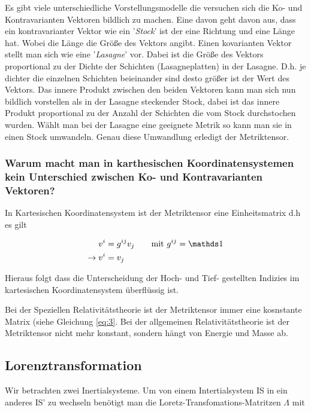 Es gibt viele unterschiedliche Vorstellungsmodelle die versuchen sich die Ko- und Kontravarianten Vektoren bildlich zu machen. Eine davon geht davon aus, dass ein kontravarianter Vektor wie ein '\textit{Stock}' ist der eine Richtung und eine Länge hat. Wobei die Länge die Größe des Vektors angibt. Einen kovarianten Vektor stellt man sich wie eine '\textit{Lasagne}' vor. Dabei ist die Größe des Vektors proportional zu der Dichte der Schichten (Lasagneplatten) in der Lasagne. D.h. je dichter die einzelnen Schichten beieinander sind desto größer ist der Wert des Vektors. Das innere Produkt zwischen den beiden Vektoren kann man sich nun bildlich vorstellen als in der Lasagne steckender Stock, dabei ist das innere Produkt proportional zu der Anzahl der Schichten die vom Stock durchstochen wurden. Wählt man bei der Lasagne eine geeignete Metrik so kann man sie in einen Stock umwandeln. Genau diese Umwandlung erledigt der Metriktensor. 

\subsubsection*{Warum macht man in karthesischen Koordinatensystemen kein Unterschied zwischen Ko- und Kontravarianten Vektoren? }

In Kartesischen Koordinatensystem ist der Metriktensor eine Einheitsmatrix d.h es gilt

\begin{align}
  \label{eq:20}
  v^i &= g^{ij}v_j \qquad\text{mit } g^{ij}=\mathds 1 \notag \\
\rightarrow v^i &= v_j 
\end{align}

Hieraus folgt dass die Unterscheidung der Hoch- und Tief- gestellten Indizies im kartesischen Koordinatensystem überflüssig ist. 

Bei der Speziellen Relativitätstheorie ist der Metriktensor immer eine kosnstante Matrix (siehe Gleichung \eqref{eq:3}. Bei der allgemeinen Relativitätstheorie ist der Metriktensor nicht mehr konstant, sondern hängt von Energie und Masse ab.


\subsection*{Lorenztransformation}

Wir betrachten zwei Inertialsysteme. Um von einem Intertialsystem IS in ein anderes IS' zu wechseln benötigt man die Loretz-Transfomations-Matritzen \(\Lambda\) mit

